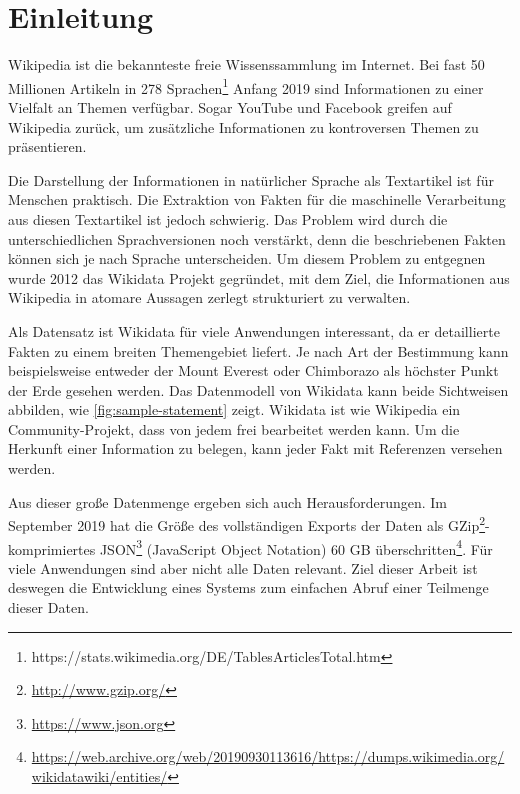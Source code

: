 %
\chapter{Einleitung}
\label{sec:intro}
Wikipedia ist die bekannteste freie Wissenssammlung im Internet.
Bei fast 50 Millionen Artikeln in 278 Sprachen\footnote{https://stats.wikimedia.org/DE/TablesArticlesTotal.htm} Anfang 2019 sind Informationen zu einer Vielfalt an Themen verfügbar.
Sogar YouTube und Facebook greifen auf Wikipedia zurück, um zusätzliche Informationen zu kontroversen Themen zu präsentieren\cite{youtube-facebook-wp}.

Die Darstellung der Informationen in natürlicher Sprache als Textartikel ist für Menschen praktisch.
Die Extraktion von Fakten für die maschinelle Verarbeitung aus diesen Textartikel ist jedoch schwierig\cite{oie-errors}\cite{extract-rel-ibm}.
Das Problem wird durch die unterschiedlichen Sprachversionen noch verstärkt, denn die beschriebenen Fakten können sich je nach Sprache unterscheiden.
Um diesem Problem zu entgegnen wurde 2012 das Wikidata Projekt gegründet, mit dem Ziel, die Informationen aus Wikipedia in atomare Aussagen zerlegt strukturiert zu verwalten\cite{wikidata}.

Als Datensatz ist Wikidata für viele Anwendungen interessant, da er detaillierte Fakten zu einem breiten Themengebiet liefert.
Je nach Art der Bestimmung kann beispielsweise entweder der Mount Everest oder Chimborazo als höchster Punkt der Erde gesehen werden.
Das Datenmodell von Wikidata kann beide Sichtweisen abbilden, wie \cref{fig:sample-statement} zeigt.
Wikidata ist wie Wikipedia ein Community-Projekt, dass von jedem frei bearbeitet werden kann.
Um die Herkunft einer Information zu belegen, kann jeder Fakt mit Referenzen versehen werden.

Aus dieser große Datenmenge ergeben sich auch Herausforderungen.
Im September 2019 hat die Größe des vollständigen Exports der Daten als GZip\footnote{\url{http://www.gzip.org/}}-komprimiertes JSON\footnote{\url{https://www.json.org}} (JavaScript Object Notation) 60 GB überschritten\footnote{\url{https://web.archive.org/web/20190930113616/https://dumps.wikimedia.org/wikidatawiki/entities/}}.
Für viele Anwendungen sind aber nicht alle Daten relevant.
Ziel dieser Arbeit ist deswegen die Entwicklung eines Systems zum einfachen Abruf einer Teilmenge dieser Daten.

